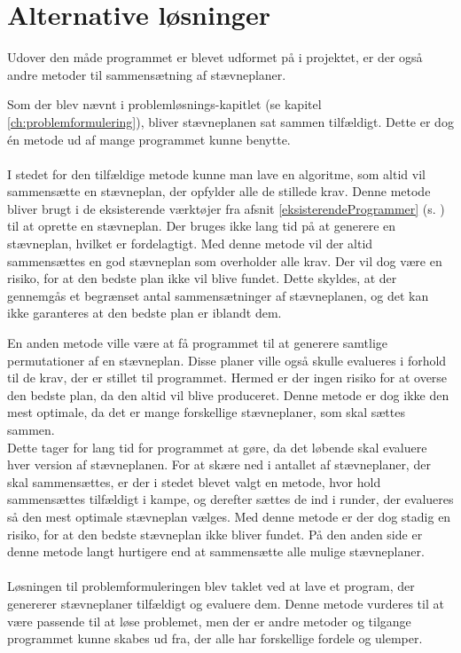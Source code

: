 \section{Alternative løsninger}
Udover den måde programmet er blevet udformet på i projektet, er der også andre metoder til sammensætning af stævneplaner.
\par
Som der blev nævnt i problemløsnings-kapitlet (se kapitel \ref{ch:problemformulering}), bliver stævneplanen sat sammen tilfældigt. Dette er dog én metode ud af mange programmet kunne benytte.
\\\\
I stedet for den tilfældige metode kunne man lave en algoritme, som altid vil sammensætte en stævneplan, der opfylder alle de stillede krav. Denne metode bliver brugt i de eksisterende værktøjer fra afsnit \ref{eksisterendeProgrammer} (s. \pageref{eksisterendeProgrammer}) til at oprette en stævneplan. Der bruges ikke lang tid på at generere en stævneplan, hvilket er fordelagtigt. Med denne metode vil der altid sammensættes en god stævneplan som overholder alle krav. Der vil dog være en risiko, for at den bedste plan ikke vil blive fundet. Dette skyldes, at der gennemgås et begrænset antal sammensætninger af stævneplanen, og det kan ikke garanteres at den bedste plan er iblandt dem.
\par
En anden metode ville være at få programmet til at generere samtlige permutationer af en stævneplan. Disse planer ville også skulle evalueres i forhold til de krav, der er stillet til programmet. Hermed er der ingen risiko for at overse den bedste plan, da den altid vil blive produceret. Denne metode er dog ikke den mest optimale, da det er mange forskellige stævneplaner, som skal sættes sammen.
\\
Dette tager for lang tid for programmet at gøre, da det løbende skal evaluere hver version af stævneplanen. For at skære ned i antallet af stævneplaner, der skal sammensættes, er der i stedet blevet valgt en metode, hvor hold sammensættes tilfældigt i kampe, og derefter sættes de ind i runder, der evalueres så den mest optimale stævneplan vælges. Med denne metode er der dog stadig en risiko, for at den bedste stævneplan ikke bliver fundet. På den anden side er denne metode langt hurtigere end at sammensætte alle mulige stævneplaner.
\\\\
Løsningen til problemformuleringen blev taklet ved at lave et program, der genererer stævneplaner tilfældigt og evaluere dem. Denne metode vurderes til at være passende til at løse problemet, men der er andre metoder og tilgange programmet kunne skabes ud fra, der alle har forskellige fordele og ulemper.

